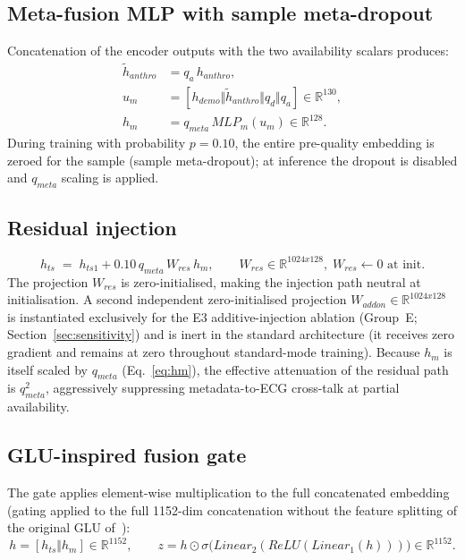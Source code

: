 \documentclass[mathematics,article,pdftex]{Definitions/mdpi}
\def\mathrm#1{#1}%
\def\mathbf#1{#1}%
\def\emph#1{#1}%
\def\times{x}%
\begin{document}
\subsection{Meta-fusion MLP with sample meta-dropout}
Concatenation of the encoder outputs with the two availability scalars produces:
\begin{equation}\label{eq:hm}
\begin{aligned}
\widetilde{\mathbf{h}}_{\mathrm{anthro}} &= q_a\,\mathbf{h}_{\mathrm{anthro}},\\
\mathbf{u}_{\mathrm{m}}&=[\mathbf{h}_{\mathrm{demo}}\Vert\widetilde{\mathbf{h}}_{\mathrm{anthro}}\Vert q_d\Vert q_a]\in\mathbb{R}^{130},\\
\mathbf{h}_{\mathrm{m}}&=q_{\mathrm{meta}}\,\mathrm{MLP}_{\mathrm{m}}(\mathbf{u}_{\mathrm{m}})\in\mathbb{R}^{128}.
\end{aligned}
\end{equation}
During training with probability $p{=}0.10$, the entire pre-quality embedding is zeroed for the sample (\emph{sample meta-dropout}); at inference the dropout is disabled and $q_{\mathrm{meta}}$ scaling is applied.

\subsection{Residual injection}
\begin{equation}\label{eq:hts}
\mathbf{h}_{\mathrm{ts}} \;=\; \mathbf{h}_{\mathrm{ts1}}
  + 0.10\,q_{\mathrm{meta}}\,\mathbf{W}_{\mathrm{res}}\,\mathbf{h}_{\mathrm{m}},\qquad
\mathbf{W}_{\mathrm{res}}\in\mathbb{R}^{1024\times 128},\;\mathbf{W}_{\mathrm{res}}\leftarrow\mathbf{0}\text{ at init.}
\end{equation}
The projection $\mathbf{W}_{\mathrm{res}}$ is zero-initialised, making the injection path neutral at initialisation. A second independent zero-initialised projection $\mathbf{W}_{\mathrm{addon}}\in\mathbb{R}^{1024\times 128}$ is instantiated exclusively for the E3 additive-injection ablation (Group~E; Section~\ref{sec:sensitivity}) and is inert in the standard architecture (it receives zero gradient and remains at zero throughout standard-mode training). Because $\mathbf{h}_{\mathrm{m}}$ is itself scaled by $q_{\mathrm{meta}}$ (Eq.~\eqref{eq:hm}), the effective attenuation of the residual path is $q_{\mathrm{meta}}^{2}$, aggressively suppressing metadata-to-ECG cross-talk at partial availability.

\subsection{GLU-inspired fusion gate}
The gate applies element-wise multiplication to the full concatenated embedding (gating applied to the full 1152-dim concatenation without the feature splitting of the original GLU of~\cite{Dauphin2017}):
\begin{equation}
\mathbf{h} = [\mathbf{h}_{\mathrm{ts}}\Vert \mathbf{h}_{\mathrm{m}}]\in\mathbb{R}^{1152}, \qquad
\mathbf{z} = \mathbf{h} \odot \sigma\!\bigl(\mathrm{Linear}_2(\mathrm{ReLU}(\mathrm{Linear}_1(\mathbf{h})))\bigr)\in\mathbb{R}^{1152}.
\end{equation}
\end{document}
